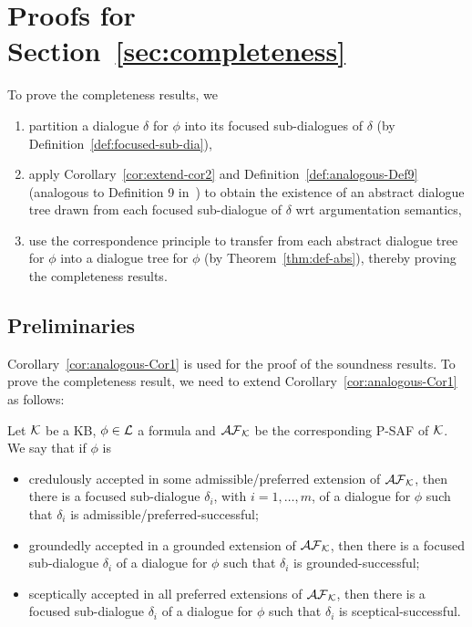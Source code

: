   
\section{Proofs for Section~\ref{sec:completeness}}
\label{app:proof-completeness}

To prove the completeness results, we

\begin{enumerate}
    \item partition a dialogue $\delta$ for $\phi$ into its focused sub-dialogues of $\delta$ (by Definition~\ref{def:focused-sub-dia}),

    \item apply Corollary~\ref{cor:extend-cor2} and Definition~\ref{def:analogous-Def9} (analogous to Definition 9 in~\cite{loanho_2024}) to obtain the existence of an abstract dialogue tree drawn from each focused sub-dialogue of $\delta$ wrt argumentation semantics,

    \item use the correspondence principle to transfer from each abstract dialogue tree for $\phi$ into a dialogue tree for $\phi$ (by Theorem~\ref{thm:def-abs}), thereby proving the completeness results.
    
\end{enumerate}

\subsection{Preliminaries}

Corollary~\ref{cor:analogous-Cor1} is used for the proof of the soundness results. To prove the completeness result, we need to extend Corollary~\ref{cor:analogous-Cor1} as follows:

\begin{corollary}
\label{cor:extend-cor2}

Let $\mathcal{K}$ be a KB, $\phi \in \mathcal{L}$ a formula and $\mathcal{AF}_{\mathcal{K}}$ be the corresponding P-SAF of $\mathcal{K}$. We say that if $\phi$ is

\begin{itemize}
    \item   credulously accepted in some admissible/preferred extension of $\mathcal{AF}_{\mathcal{K}}$, then there is a focused sub-dialogue $\delta_i$, with $i = 1, \ldots, m$, of a dialogue for $\phi$ such that $\delta_i$ is admissible/preferred-successful;
    
    \item groundedly accepted in a grounded extension of $\mathcal{AF}_{\mathcal{K}}$, then there is a focused sub-dialogue $\delta_i$ of a dialogue for $\phi$  such that $\delta_i$ is grounded-successful;

    \item  sceptically accepted in all preferred extensions of $\mathcal{AF}_{\mathcal{K}}$, then there is a focused sub-dialogue $\delta_i$ of a dialogue for $\phi$ such that $\delta_i$ is sceptical-successful.   
\end{itemize}     
\end{corollary}

